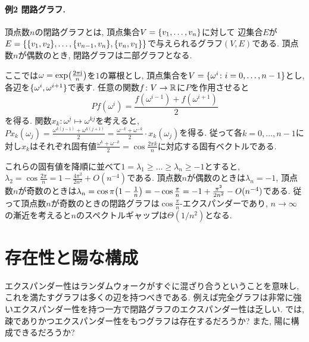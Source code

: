 \paragraph*{例2 閉路グラフ.}
頂点数$n$の閉路グラフとは, 頂点集合$V=\lbrace v_1,\dots,v_n\rbrace$に対して
辺集合$E$が$E = \lbrace\lbrace v_1,v_2\rbrace,\dots,\lbrace v_{n-1},v_n\rbrace, \lbrace v_n,v_1\rbrace\rbrace$で与えられるグラフ$(V,E)$である.
頂点数$n$が偶数のとき, 閉路グラフは二部グラフとなる.

ここでは$\omega = \exp\rbra*{\frac{2\pi \mathrm{i}}{n}}$を$1$の冪根とし,
頂点集合を$V=\lbrace\omega^i \colon i=0,\dots,n-1\rbrace$とし, 各辺を$\lbrace\omega^i,\omega^{i+1}\rbrace$で表す.
任意の関数$f\colon V\to \mathbb{R}$に$P$を作用させると
\[ Pf(\omega^i) = \frac{f(\omega^{i-1}) + f(\omega^{i+1})}{2}\]
を得る.
関数$x_k\colon \omega^j \mapsto \omega^{kj}$を考えると,
$Px_k (\omega_j) = \frac{\omega^{k(j-1)} + \omega^{k(j+1)}}{2} = \frac{\omega^{-k}+\omega^{-k}}{2}\cdot x_k(\omega_j)$を得る.
従って各$k=0,\dots,n-1$に対し$x_k$はそれぞれ固有値$\frac{\omega^k + \omega^{-k}}{2} = \cos\frac{2\pi k}{n}$に対応する固有ベクトルである.

これらの固有値を降順に並べて$1=\lambda_1\ge \dots\ge \lambda_n\ge-1$とすると,
$\lambda_2 = \cos\frac{2\pi}{n} = 1-\frac{4\pi^2}{2n^2} + O(n^{-4})$である.
頂点数$n$が偶数のときは$\lambda_n = -1$,
頂点数$n$が奇数のときは$\lambda_n = \cos\pi\rbra*{1 - \frac{1}{n}} = -\cos\frac{\pi}{n} = -1 + \frac{\pi^2}{2n^2} - O(n^{-4})$である.
従って頂点数$n$が奇数のときの閉路グラフは$\cos\frac{\pi}{n}$-エクスパンダーであり,
$n\to\infty$の漸近を考えると$n$のスペクトルギャップは$\Theta(1/n^2)$となる.

\section{存在性と陽な構成}
エクスパンダー性はランダムウォークがすぐに混ざり合うということを意味し, これを満たすグラフは多くの辺を持つべきである.
例えば完全グラフは非常に強いエクスパンダー性を持つ一方で閉路グラフのエクスパンダー性は乏しい.
では, 疎でありかつエクスパンダー性をもつグラフは存在するだろうか?
また, 陽に構成できるだろうか?
%
